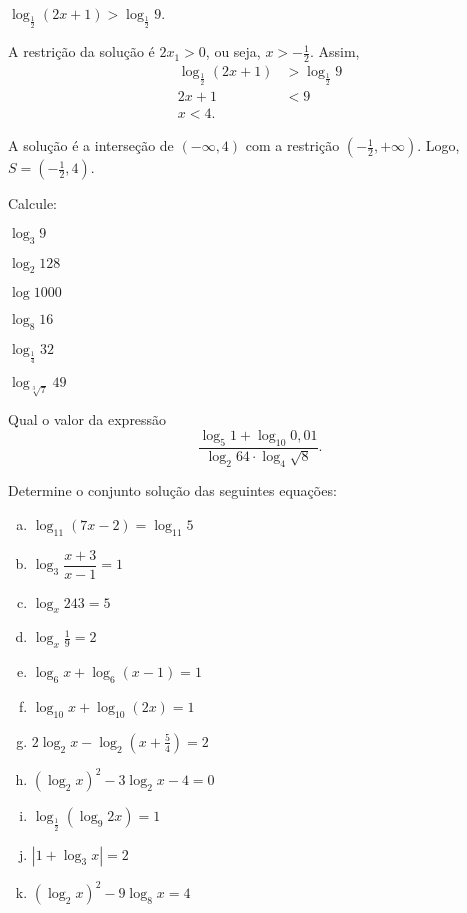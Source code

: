     \begin{exem}
  $\log_{\frac{1}{2}}(2x+1)>\log_{\frac{1}{2}} 9$.

  A restrição da solução é $2x_1>0$, ou seja, $x>-\frac{1}{2}$. Assim,
  \begin{align*}
      \log_{\frac{1}{2}}(2x+1)&>\log_{\frac{1}{2}} 9\\
      2x+1&<9\\
      x<4.
  \end{align*}

  A solução é a interseção de $(-\infty,4)$ com a restrição $(-\frac{1}{2},+\infty)$. Logo, $S=(-\frac{1}{2},4)$.
  \end{exem}
\begin{secExercicios}

\begin{exer}
    Calcule:
    \begin{enumerate}[a)]
        \begin{multicols}{2}
        \item $\log_3 9$
        \item $\log_2 128$
        \item $\log 1000$
        \item $\log_8 16$
        \item $\log_{\frac{1}{4}} 32$
        \item $\log_{\sqrt[3]{7}} 49$
        \end{multicols}
    \end{enumerate}
\end{exer}

\begin{exer}
    Qual o valor da expressão
    \begin{equation*}
        \dfrac{\log_5 1 +\log_{10} 0,01}{\log_2 64 \cdot \log_4 \sqrt{8}}.
    \end{equation*}
\end{exer}

\begin{exer}
    Determine o conjunto solução das seguintes equações:
    \begin{enumerate}[a)]
        \item $\log_{11} (7x-2)=\log_{11} 5$
        \item $\log_3 \dfrac{x+3}{x-1}=1$
        \item $\log_x 243 =5$
        \item $\log_x \frac{1}{9}=2$
        \item $\log_6 x + \log_6 (x-1) = 1$
        \item $ \log_{10} x +\log_{10}(2x) = 1 $
        \item $2\log_{2}x - \log_{2}(x+\frac{5}{4})=2$
        \item $(\log_2 x)^2 - 3 \log_2 x -4=0$
        \item $\log_{\frac{1}{2}}(\log_9 2x)=1$
        \item $|1+\log_3 x|=2$
        \item $(\log_2 x)^2 - 9 \log_8 x=4$
    \end{enumerate}
\end{exer}


\end{secExercicios}
